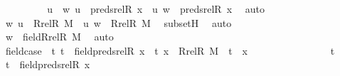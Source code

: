\begin{isabellebody}
\ \ \ \ \ \ \isamarkupfalse%
\ \isamarkupfalse%
\ u\ \ {\isachardoublequoteopen}{\isacharless}{\kern0pt}w{\isacharcomma}{\kern0pt}\ u{\isachargreater}{\kern0pt}\ {\isasymin}\ preds{\isacharunderscore}{\kern0pt}rel{\isacharparenleft}{\kern0pt}R{\isacharcomma}{\kern0pt}\ x{\isacharparenright}{\kern0pt}\ {\isasymor}\ {\isacharless}{\kern0pt}u{\isacharcomma}{\kern0pt}\ w{\isachargreater}{\kern0pt}\ {\isasymin}\ preds{\isacharunderscore}{\kern0pt}rel{\isacharparenleft}{\kern0pt}R{\isacharcomma}{\kern0pt}\ x{\isacharparenright}{\kern0pt}{\isachardoublequoteclose}\ \isamarkupfalse%
\ auto\ \isanewline
\ \ \ \ \ \ \isamarkupfalse%
\ \isamarkupfalse%
\ {\isachardoublequoteopen}{\isacharless}{\kern0pt}w{\isacharcomma}{\kern0pt}\ u{\isachargreater}{\kern0pt}\ {\isasymin}\ Rrel{\isacharparenleft}{\kern0pt}R{\isacharcomma}{\kern0pt}\ M{\isacharparenright}{\kern0pt}\ {\isasymor}\ {\isacharless}{\kern0pt}u{\isacharcomma}{\kern0pt}\ w{\isachargreater}{\kern0pt}\ {\isasymin}\ Rrel{\isacharparenleft}{\kern0pt}R{\isacharcomma}{\kern0pt}\ M{\isacharparenright}{\kern0pt}{\isachardoublequoteclose}\ \isamarkupfalse%
\ subsetH\ \isamarkupfalse%
\ auto\ \isanewline
\ \ \ \ \ \ \isamarkupfalse%
\ \isamarkupfalse%
\ {\isachardoublequoteopen}w\ {\isasymin}\ field{\isacharparenleft}{\kern0pt}Rrel{\isacharparenleft}{\kern0pt}R{\isacharcomma}{\kern0pt}\ M{\isacharparenright}{\kern0pt}{\isacharparenright}{\kern0pt}{\isachardoublequoteclose}\ \isamarkupfalse%
\ auto\ \isanewline
\ \ \ \ \isamarkupfalse%
\ \isanewline
\isanewline
\ \ \ \ \isamarkupfalse%
\ fieldcase\ {\isacharcolon}{\kern0pt}\ {\isachardoublequoteopen}{\isasymAnd}t{\isachardot}{\kern0pt}\ t\ {\isasymin}\ field{\isacharparenleft}{\kern0pt}preds{\isacharunderscore}{\kern0pt}rel{\isacharparenleft}{\kern0pt}R{\isacharcomma}{\kern0pt}\ x{\isacharparenright}{\kern0pt}{\isacharparenright}{\kern0pt}\ {\isasymLongrightarrow}\ {\isacharless}{\kern0pt}t{\isacharcomma}{\kern0pt}\ x{\isachargreater}{\kern0pt}\ {\isasymin}\ Rrel{\isacharparenleft}{\kern0pt}R{\isacharcomma}{\kern0pt}\ M{\isacharparenright}{\kern0pt}\ {\isasymor}\ t\ {\isacharequal}{\kern0pt}\ x{\isachardoublequoteclose}\ \isanewline
\ \ \ \ \isamarkupfalse%
\ {\isacharminus}{\kern0pt}\ \isanewline
\ \ \ \ \ \ \isamarkupfalse%
\ t\ \isamarkupfalse%
\ {\isachardoublequoteopen}t\ {\isasymin}\ field{\isacharparenleft}{\kern0pt}preds{\isacharunderscore}{\kern0pt}rel{\isacharparenleft}{\kern0pt}R{\isacharcomma}{\kern0pt}\ x{\isacharparenright}{\kern0pt}{\isacharparenright}{\kern0pt}{\isachardoublequoteclose}\ \isanewline

\end{isabellebody}
